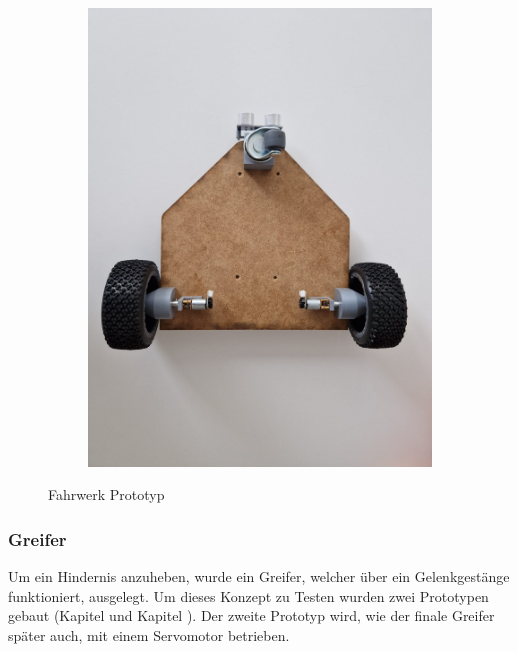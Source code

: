 \begin{figure}[H]
\begin{subfigure}{0.32\textwidth}
\end{subfigure}
\begin{subfigure}{0.32\textwidth}
\centering
\includegraphics[width=0.95\linewidth]{assets/prototyp-fahrwerk/fahrwerk-unten.jpeg} 
\end{subfigure}
\caption{Fahrwerk Prototyp}
\label{fig:prototype-fahrwerk}
\end{figure}

\subsubsection*{Greifer}


Um ein Hindernis anzuheben, wurde ein Greifer, welcher über ein Gelenkgestänge funktioniert, ausgelegt. Um dieses Konzept zu Testen wurden zwei Prototypen gebaut (Kapitel  und Kapitel ). Der zweite Prototyp wird, wie der finale Greifer später auch, mit einem Servomotor betrieben. 

